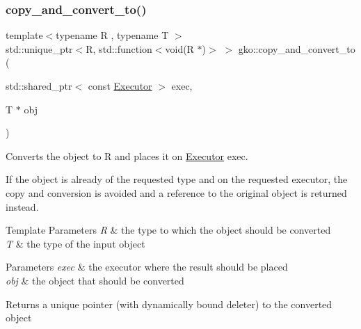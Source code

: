 \subsubsection{\texorpdfstring{copy\+\_\+and\+\_\+convert\+\_\+to()}{copy\_and\_convert\_to()}\hspace{0.1cm}{\footnotesize\ttfamily [1/4]}}
{\footnotesize\ttfamily template$<$typename R , typename T $>$ \\
std\+::unique\+\_\+ptr$<$R, std\+::function$<$void(R $\ast$)$>$ $>$ gko\+::copy\+\_\+and\+\_\+convert\+\_\+to (\begin{DoxyParamCaption}\item[{std\+::shared\+\_\+ptr$<$ const \hyperlink{classgko_1_1Executor}{Executor} $>$}]{exec,  }\item[{T $\ast$}]{obj }\end{DoxyParamCaption})}



Converts the object to R and places it on \hyperlink{classgko_1_1Executor}{Executor} exec. 

If the object is already of the requested type and on the requested executor, the copy and conversion is avoided and a reference to the original object is returned instead.


\begin{DoxyTemplParams}{Template Parameters}
{\em R} & the type to which the object should be converted \\
\hline
{\em T} & the type of the input object\\
\hline
\end{DoxyTemplParams}

\begin{DoxyParams}{Parameters}
{\em exec} & the executor where the result should be placed \\
\hline
{\em obj} & the object that should be converted\\
\hline
\end{DoxyParams}
\begin{DoxyReturn}{Returns}
a unique pointer (with dynamically bound deleter) to the converted object 
\end{DoxyReturn}
\mbox{\label{namespacegko_add859060efaa729c84788bb4f6582e9f}} 
